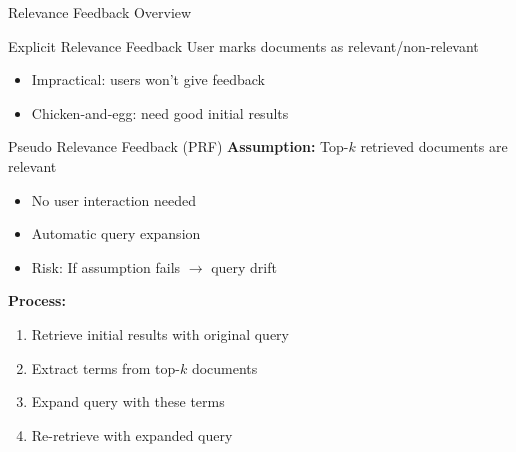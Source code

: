 \documentclass[aspectratio=169]{beamer}
\begin{document}
\begin{frame}[shrink=5]{Relevance Feedback Overview}
\begin{block}{Explicit Relevance Feedback}
User marks documents as relevant/non-relevant
\begin{itemize}
    \item \textcolor{red}{} Impractical: users won't give feedback
    \item \textcolor{red}{} Chicken-and-egg: need good initial results
\end{itemize}
\end{block}

\vspace{1em}

\begin{block}{Pseudo Relevance Feedback (PRF)}
\textbf{Assumption:} Top-$k$ retrieved documents are relevant
\begin{itemize}
    \item \textcolor{green}{\checkmark} No user interaction needed
    \item \textcolor{green}{\checkmark} Automatic query expansion
    \item \textcolor{red}{} Risk: If assumption fails $\rightarrow$ query drift
\end{itemize}
\end{block}

\vspace{1em}

\textbf{Process:}
\begin{enumerate}
    \item Retrieve initial results with original query
    \item Extract terms from top-$k$ documents
    \item Expand query with these terms
    \item Re-retrieve with expanded query
\end{enumerate}
\end{frame}
\end{document}
